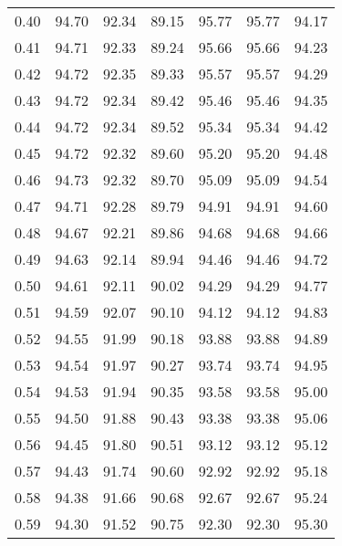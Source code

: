 \begin{tabular}{|c|c|c|c|c|c|c|}
      0.40 &     94.70 &     92.34 &      89.15 &   95.77 &      95.77 &         94.17 \\
      0.41 &     94.71 &     92.33 &      89.24 &   95.66 &      95.66 &         94.23 \\
      0.42 &     94.72 &     92.35 &      89.33 &   95.57 &      95.57 &         94.29 \\
      0.43 &     94.72 &     92.34 &      89.42 &   95.46 &      95.46 &         94.35 \\
      0.44 &     94.72 &     92.34 &      89.52 &   95.34 &      95.34 &         94.42 \\
      0.45 &     94.72 &     92.32 &      89.60 &   95.20 &      95.20 &         94.48 \\
      0.46 &     94.73 &     92.32 &      89.70 &   95.09 &      95.09 &         94.54 \\
      0.47 &     94.71 &     92.28 &      89.79 &   94.91 &      94.91 &         94.60 \\
      0.48 &     94.67 &     92.21 &      89.86 &   94.68 &      94.68 &         94.66 \\
      0.49 &     94.63 &     92.14 &      89.94 &   94.46 &      94.46 &         94.72 \\
      0.50 &     94.61 &     92.11 &      90.02 &   94.29 &      94.29 &         94.77 \\
      0.51 &     94.59 &     92.07 &      90.10 &   94.12 &      94.12 &         94.83 \\
      0.52 &     94.55 &     91.99 &      90.18 &   93.88 &      93.88 &         94.89 \\
      0.53 &     94.54 &     91.97 &      90.27 &   93.74 &      93.74 &         94.95 \\
      0.54 &     94.53 &     91.94 &      90.35 &   93.58 &      93.58 &         95.00 \\
      0.55 &     94.50 &     91.88 &      90.43 &   93.38 &      93.38 &         95.06 \\
      0.56 &     94.45 &     91.80 &      90.51 &   93.12 &      93.12 &         95.12 \\
      0.57 &     94.43 &     91.74 &      90.60 &   92.92 &      92.92 &         95.18 \\
      0.58 &     94.38 &     91.66 &      90.68 &   92.67 &      92.67 &         95.24 \\
      0.59 &     94.30 &     91.52 &      90.75 &   92.30 &      92.30 &         95.30 \\

\end{tabular}
